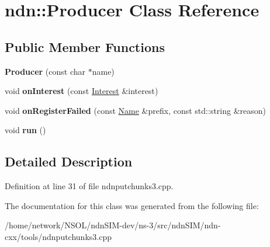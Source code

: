 \hypertarget{classndn_1_1Producer}{}\section{ndn\+:\+:Producer Class Reference}
\label{classndn_1_1Producer}
\subsection*{Public Member Functions}
\begin{DoxyCompactItemize}
\item 
{\bfseries Producer} (const char $\ast$name)\hypertarget{classndn_1_1Producer_a1caca86990ea31fd175a1546ed05ab21}{}\label{classndn_1_1Producer_a1caca86990ea31fd175a1546ed05ab21}

\item 
void {\bfseries on\+Interest} (const \hyperlink{classndn_1_1Interest}{Interest} \&interest)\hypertarget{classndn_1_1Producer_affd34d7f2b808ca11d7e2699290a3cde}{}\label{classndn_1_1Producer_affd34d7f2b808ca11d7e2699290a3cde}

\item 
void {\bfseries on\+Register\+Failed} (const \hyperlink{classndn_1_1Name}{Name} \&prefix, const std\+::string \&reason)\hypertarget{classndn_1_1Producer_ab3474f1b6456d76543609c92dba45ce7}{}\label{classndn_1_1Producer_ab3474f1b6456d76543609c92dba45ce7}

\item 
void {\bfseries run} ()\hypertarget{classndn_1_1Producer_a9800ad3300d8b8608788da67b99b0649}{}\label{classndn_1_1Producer_a9800ad3300d8b8608788da67b99b0649}

\end{DoxyCompactItemize}


\subsection{Detailed Description}


Definition at line 31 of file ndnputchunks3.\+cpp.



The documentation for this class was generated from the following file\+:\begin{DoxyCompactItemize}
\item 
/home/network/\+N\+S\+O\+L/ndn\+S\+I\+M-\/dev/ns-\/3/src/ndn\+S\+I\+M/ndn-\/cxx/tools/ndnputchunks3.\+cpp\end{DoxyCompactItemize}

